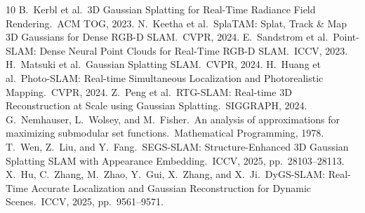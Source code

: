 \documentclass[10pt,twocolumn,letterpaper]{article}
\begin{document}
{\footnotesize

\begin{thebibliography}{10}\itemsep=-4pt
 B.~Kerbl et al.\ 3D Gaussian Splatting for Real-Time Radiance Field Rendering.\ ACM TOG, 2023.
 N.~Keetha et al.\ SplaTAM: Splat, Track \& Map 3D Gaussians for Dense RGB-D SLAM.\ CVPR, 2024.
 E.~Sandstrom et al.\ Point-SLAM: Dense Neural Point Clouds for Real-Time RGB-D SLAM.\ ICCV, 2023.
 H.~Matsuki et al.\ Gaussian Splatting SLAM.\ CVPR, 2024.
 H.~Huang et al.\ Photo-SLAM: Real-time Simultaneous Localization and Photorealistic Mapping.\ CVPR, 2024.
 Z.~Peng et al.\ RTG-SLAM: Real-time 3D Reconstruction at Scale using Gaussian Splatting.\ SIGGRAPH, 2024.
 G.~Nemhauser, L.~Wolsey, and M.~Fisher.\ An analysis of approximations for maximizing submodular set functions.\ Mathematical Programming, 1978.
 T.~Wen, Z.~Liu, and Y.~Fang.\ SEGS-SLAM: Structure-Enhanced 3D Gaussian Splatting SLAM with Appearance Embedding.\ ICCV, 2025, pp.\ 28103--28113.
 X.~Hu, C.~Zhang, M.~Zhao, Y.~Gui, X.~Zhang, and X.~Ji.\ DyGS-SLAM: Real-Time Accurate Localization and Gaussian Reconstruction for Dynamic Scenes.\ ICCV, 2025, pp.\ 9561--9571.
\end{thebibliography}
}
\end{document}
